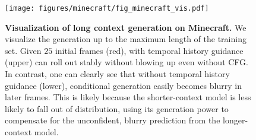 
\begin{figure}[t]
    \centering
    \texttt{[image: figures/minecraft/fig\_minecraft\_vis.pdf]}
    \vskip -0.1in
    \caption{
        \textbf{Visualization of long context generation on Minecraft.} We visualize the generation up to the maximum length of the training set. Given $25$ initial frames (red), \mtd with temporal history guidance (upper) can roll out stably without blowing up even without CFG. In contrast, one can clearly see that without temporal history guidance (lower), conditional generation easily becomes blurry in later frames. This is likely because the shorter-context model is less likely to fall out of distribution, using its generation power to compensate for the unconfident, blurry prediction from the longer-context model.
    }
    \label{fig:minecraft_vis}
    \vskip -0.2in
\end{figure}
